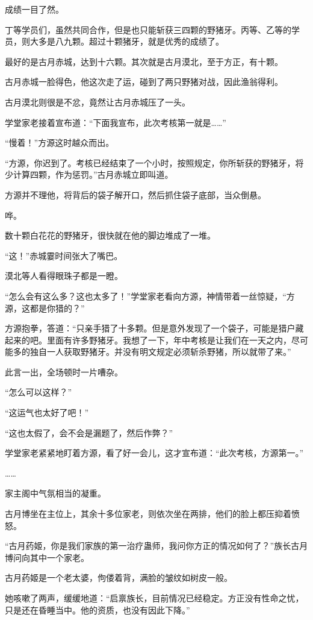 \begin{this_body}
成绩一目了然。

丁等学员们，虽然共同合作，但是也只能斩获三四颗的野猪牙。丙等、乙等的学员，则大多是八九颗。超过十颗猪牙，就是优秀的成绩了。

最好的是古月赤城，达到十六颗。其次就是古月漠北，至于方正，有十颗。

古月赤城一脸得色，他这次走了运，碰到了两只野猪对战，因此渔翁得利。

古月漠北则很是不忿，竟然让古月赤城压了一头。

学堂家老接着宣布道：“下面我宣布，此次考核第一就是……”

“慢着！”方源这时越众而出。

“方源，你迟到了。考核已经结束了一个小时，按照规定，你所斩获的野猪牙，将少计算四颗，作为惩罚。”古月赤城立即叫道。

方源并不理他，将背后的袋子解开口，然后抓住袋子底部，当众倒悬。

哗。

数十颗白花花的野猪牙，很快就在他的脚边堆成了一堆。

“这！”赤城霎时间张大了嘴巴。

漠北等人看得眼珠子都是一瞪。

“怎么会有这么多？这也太多了！”学堂家老看向方源，神情带着一丝惊疑，“方源，这都是你猎的？”

方源抱拳，答道：“只亲手猎了十多颗。但是意外发现了一个袋子，可能是猎户藏起来的吧。里面有许多野猪牙。我想了一下，年中考核是让我们在一天之内，尽可能多的独自一人获取野猪牙。并没有明文规定必须斩杀野猪，所以就带了来。”

此言一出，全场顿时一片嘈杂。

“怎么可以这样？”

“这运气也太好了吧！”

“这也太假了，会不会是漏题了，然后作弊？”

学堂家老紧紧地盯着方源，看了好一会儿，这才宣布道：“此次考核，方源第一。”

……

家主阁中气氛相当的凝重。

古月博坐在主位上，其余十多位家老，则依次坐在两排，他们的脸上都压抑着愤怒。

“古月药姬，你是我们家族的第一治疗蛊师，我问你方正的情况如何了？”族长古月博问向其中一个家老。

古月药姬是一个老太婆，佝偻着背，满脸的皱纹如树皮一般。

她咳嗽了两声，缓缓地道：“启禀族长，目前情况已经稳定。方正没有性命之忧，只是还在昏睡当中。他的资质，也没有因此下降。”


\end{this_body}
